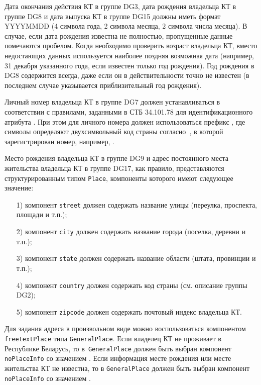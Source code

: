 Дата окончания действия КТ в группе DG3, дата рождения владельца КТ в группе DG8 
и дата выпуска КТ в группе DG15 должны иметь формат YYYYMMDD 
(4 символа года, 2 символа месяца, 2 символа 
числа месяца). В случае, если дата рождения известна не полностью, 
пропущенные данные помечаются пробелом. Когда необходимо проверить 
возраст владельца КТ, вместо недостающих данных используется наиболее 
поздняя возможная дата (например, 31 декабря указанного года, если 
известен только год рождения). Год рождения в DG8 содержится всегда, даже 
если он в действительности точно не известен (в последнем случае 
указывается приблизительный год рождения). 

Личный номер владельца КТ в группе DG7 должен устанавливаться в соответствии с правилами,
заданными в СТБ 34.101.78 для идентификационного атрибута . 
При этом для личного номера должен использоваться префикс ,
где символы  определяют двухсимвольный код страны согласно~\cite{CountryCodes}, 
в которой зарегистрирован номер, например, .

Место рождения владельца КТ в группе DG9 и адрес постоянного места жительства 
владельца КТ в группе DG17, как правило, представляются структурированным типом \verb|Place|, 
компоненты которого имеют следующее значение: 

\begin{enumerate}
\item[1)]
компонент \verb|street| должен содержать название улицы (переулка, 
проспекта, площади и т.п.); 
\item[2)]
компонент \verb|city| должен содержать название города (поселка, деревни и т.п.); 
\item[3)]
компонент \verb|state| должен содержать название области (штата, провинции и т.п.);
\item[4)]
компонент \verb|country| должен содержать код страны (см. описание группы DG2);
\item[5)]
компонент \verb|zipcode| должен содержать почтовый индекс владельца КТ.
\end{enumerate}

Для задания адреса в произвольном виде можно воспользоваться компонентом 
\verb|freetextPlace| типа \verb|GeneralPlace|. Если владелец КТ не проживает в 
Республике Беларусь, то в~\verb|GeneralPlace| должен быть выбран компонент 
\verb|noPlaceInfo| со значением . 
Если информация месте рождения или месте жительства 
КТ не известна, то в \verb|GeneralPlace| 
должен быть выбран компонент \verb|noPlaceInfo| со значением 
. 

